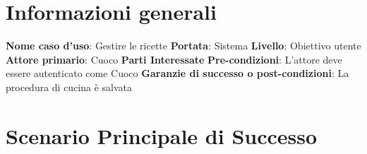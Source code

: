 
\section*{Informazioni generali}
\textbf{Nome caso d'uso}{: Gestire le ricette}\newline
\textbf{Portata}{: Sistema}\newline
\textbf{Livello}{: Obiettivo utente}\newline
\textbf{Attore primario}{: Cuoco}\newline
\textbf{Parti Interessate}\newline
\textbf{Pre-condizioni}{: L'attore deve essere autenticato come Cuoco}\newline
\textbf{Garanzie di successo o post-condizioni}{: La procedura di cucina è salvata}

\small
\section*{Scenario Principale di Successo}
\def\arraystretch{1.55}%

